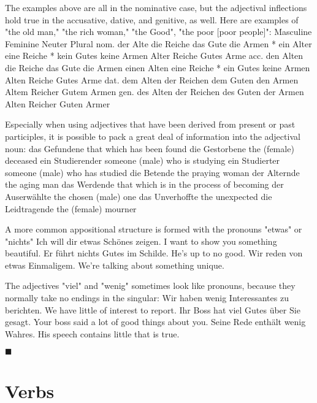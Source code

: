 \documentclass[a4paper,twocolumn,10pt]{article}
\newcommand{\sectionend}
{
\nolinenumbers
\begin{center}
	$\blacksquare$
\end{center}
\clearpage
\linenumbers
}
\newcommand{\subsectionend}
{
\nolinenumbers
\linenumbers
}
\begin{document}
The examples above are all in the nominative case, but the adjectival inflections hold true in the accusative, dative, and genitive, as well. Here are examples of "the old man," "the rich woman," "the Good", "the poor [poor people]":
          	Masculine 	Feminine 	Neuter 	Plural
 nom. 	der Alte  	die Reiche  	das Gute  	die Armen 
  	* ein Alter  	eine Reiche  	* kein Gutes  	keine Armen 
  	Alter  	Reiche  	Gutes  	Arme 
 acc.  	den Alten  	die Reiche  	das Gute  	die Armen 
  	einen Alten  	eine Reiche  	* ein Gutes  	keine Armen 
  	Alten  	Reiche  	Gutes  	Arme 
 dat.  	dem Alten  	der Reichen  	dem Guten  	den Armen 
  	Altem  	Reicher  	Gutem  	Armen 
 gen.  	des Alten  	der Reichen  	des Guten  	der Armen 
  	Alten  	Reicher  	Guten  	Armer 

Especially when using adjectives that have been derived from present or past participles, it is possible to pack a great deal of information into the adjectival noun:
das Gefundene  	that which has been found
die Gestorbene  	the (female) deceased
ein Studierender  	someone (male) who is studying
ein Studierter  	someone (male) who has studied
die Betende  	the praying woman
der Alternde  	the aging man
das Werdende  	that which is in the process of becoming
der Auserwählte  	the chosen (male) one
das Unverhoffte  	the unexpected
die Leidtragende  	the (female) mourner

A more common appositional structure is formed with the pronouns "etwas" or "nichts"
Ich will dir etwas Schönes zeigen.  	I want to show you something beautiful.
Er führt nichts Gutes im Schilde.  	He's up to no good.
Wir reden von etwas Einmaligem.  	We're talking about something unique.

The adjectives "viel" and "wenig" sometimes look like pronouns, because they normally take no endings in the singular:
Wir haben wenig Interessantes zu berichten.  	We have little of interest to report.
Ihr Boss hat viel Gutes über Sie gesagt.  	Your boss said a lot of good things about you.
Seine Rede enthält wenig Wahres.  	His speech contains little that is true.


\subsectionend


\sectionend


\section{{Verbs}}
\label{sec:verbs}
\end{document}
